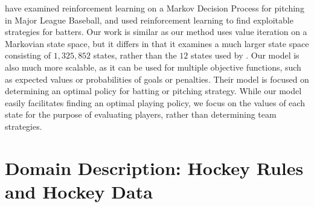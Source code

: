 \documentclass[]{article}
\begin{document}
\citep{Sidhu2014} have examined reinforcement learning on a Markov Decision Process for pitching in Major League Baseball, and used reinforcement learning to find exploitable strategies for batters. Our work is similar as our method uses value iteration on a Markovian state space, but it differs in that it examines a much larger state space consisting of $1,325,852$ states, rather than the $12$ states used by \citep{Sidhu2014}. Our model is also much more scalable, as it can be used for multiple objective functions, such as expected values or probabilities of goals or penalties. Their model is focused on determining an optimal policy for batting or pitching strategy. While our model easily facilitates finding an optimal playing policy, we focus on the values of each state for the purpose of evaluating players, rather than determining team strategies.

%
%



\section{Domain Description: Hockey Rules and Hockey Data}
\label{sec:background-notation}
\end{document}
